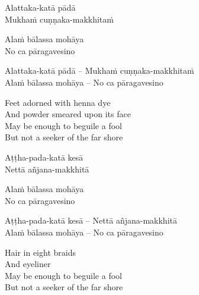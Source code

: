\ifninebythirteen

\clearpage

\begin{pali-hang-verses}
  Alattaka-katā pādā\\
  Mukhaṁ cuṇṇaka-makkhitaṁ
\end{pali-hang-verses}
\begin{pali-hang-together}
  Alaṁ bālassa mohāya\\
  No ca pāragavesino
\end{pali-hang-together}

\else

\begin{verses}
  Alattaka-katā pādā – Mukhaṁ cuṇṇaka-makkhitaṁ\\
  Alaṁ bālassa mohāya – No ca pāragavesino
\end{verses}

\fi

\begin{english-verses}
  Feet adorned with henna dye\\
  And powder smeared upon its face\\
  May be enough to beguile a fool\\
  But not a seeker of the far shore
\end{english-verses}

\ifbfive\clearpage\fi

\ifninebythirteen

\begin{pali-hang-verses}
  Aṭṭha-pada-katā kesā\\
  Nettā añjana-makkhitā
\end{pali-hang-verses}
\begin{pali-hang-together}
  Alaṁ bālassa mohāya\\
  No ca pāragavesino
\end{pali-hang-together}

\else

\begin{verses}
  Aṭṭha-pada-katā kesā – Nettā añjana-makkhitā\\
  Alaṁ bālassa mohāya – No ca pāragavesino
\end{verses}

\fi

\ifafive\clearpage\fi

\begin{english-verses}
  Hair in eight braids\\
  And eyeliner\\
  May be enough to beguile a fool\\
  But not a seeker of the far shore
\end{english-verses}

